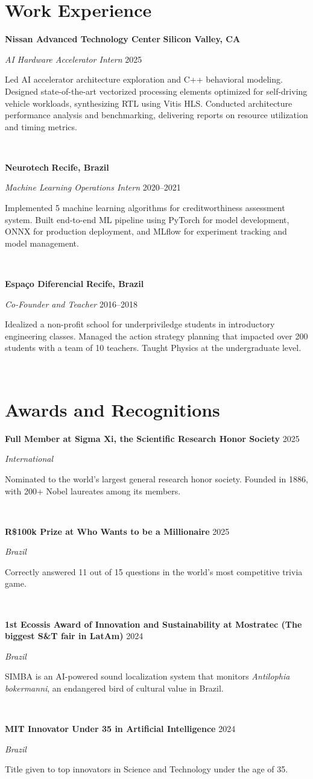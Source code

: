 \documentclass[letterpaper,10pt]{article}
\newcommand{\entry}[4]{

\begin{minipage}[t]{.15\textwidth}
\end{minipage}
\hfill\vline\hfill 
\begin{minipage}[t]{0.95\textwidth}
#2 \hfill \textsc{#1}

\textit{#3}

\footnotesize{#4}
\end{minipage}\\\vspace{.25cm}}
\newcommand{\we}[5]{

\begin{minipage}[t]{.15\textwidth}
\end{minipage}
\hfill\vline\hfill 
\begin{minipage}[t]{0.95\textwidth}
#2 \hfill \textbf{#5}

\textit{#3} \hfill \textsc{#1}

\footnotesize{#4}
\end{minipage}\\\vspace{.25cm}}
\begin{document}
\section{Work Experience}
\vspace*{.1cm}
\we{2025}{\textbf{Nissan Advanced Technology Center}}{AI Hardware Accelerator Intern}{
	Led AI accelerator architecture exploration and C++ behavioral modeling. Designed state-of-the-art vectorized processing elements optimized for self-driving vehicle workloads, synthesizing RTL using Vitis HLS. Conducted architecture performance analysis and benchmarking, delivering reports on resource utilization and timing metrics.
	}{Silicon Valley, CA}
\we{2020--2021}{\textbf{Neurotech}}{Machine Learning Operations Intern}{
	Implemented 5 machine learning algorithms for creditworthiness assessment system. Built end-to-end ML pipeline using PyTorch for model development, ONNX for production deployment, and MLflow for experiment tracking and model management.
	}{Recife, Brazil}
\we{2016--2018}{\textbf{Espaço Diferencial}}{Co-Founder and Teacher}{
	Idealized a non-profit school for underpriviledge students in introductory engineering classes. Managed the action strategy planning that impacted over 200 students with a team of 10 teachers. Taught Physics at the undergraduate level.
	}{Recife, Brazil}
\vspace*{-.25cm}
\section{Awards and Recognitions}
\vspace*{.1cm}

\entry{2025}{\textbf{Full Member at Sigma Xi, the Scientific Research Honor Society}}{International}{
	Nominated to the world’s largest general research honor society. Founded in 1886, with 200+ Nobel laureates among its members.
}

\entry{2025}{\textbf{R\$100k Prize at Who Wants to be a Millionaire}}{Brazil}{
	Correctly answered 11 out of 15 questions in the world's most competitive trivia game.	
}

\entry{2024}{\textbf{1st Ecossis Award of Innovation and Sustainability at Mostratec (The biggest S\&T fair in LatAm)}}{Brazil}{
	SIMBA is an AI-powered sound localization system that monitors \textit{Antilophia bokermanni}, an endangered bird of cultural value in Brazil.	
}

\entry{2024}{\textbf{MIT Innovator Under 35 in Artificial Intelligence}}{Brazil}{
	Title given to top innovators in Science and Technology under the age of 35.	
}
\end{document}
